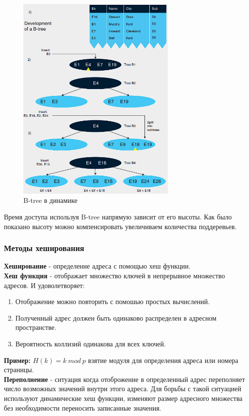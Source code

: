 \documentclass{article}
\begin{document}
\begin{figure}[ht]
    \centering
    \includegraphics[width=0.7\textwidth]{images/btree.png}
    \caption{B-tree в динамике}
    \label{img2}
\end{figure}
\newpage
Время доступа используя B-tree напрямую зависит от его высоты. Как было показано высоту можно компенсировать увеличиваем количества поддеревьев.

\subsubsection{Методы хеширования}
\textbf{Хеширование} - определение адреса с помощью хеш функции.\\
\textbf{Хеш функция} - отображает множество ключей в непрерывное множество адресов. И удоволетворяет:
\begin{enumerate}
    \item Отображение можно повторить с помошью простых вычислений.
    \item Полученный адрес должен быть одинаково распределен в адресном пространстве.
    \item Вероятность коллизий одинакова для всех ключей.
\end{enumerate}
\textbf{Пример:} $H(k) = k \: mod \: p$ взятие модуля для определения адреса или номера страницы.\\
\textbf{Переполнение} - ситуация когда отоброжение в определенный адрес переполняет число возможных значений внутри этого адреса. Для борьбы с такой ситуацией используют динамические хеш функции, изменяют размер адресного множества без необходимости переносить записанные значения.
\end{document}
